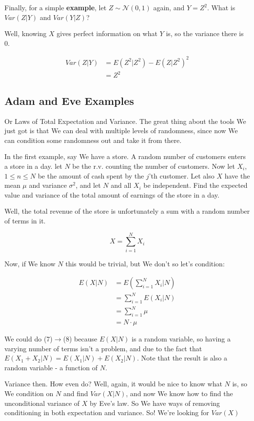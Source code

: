 \documentclass{article}
\begin{document}
		Finally, for a simple \textbf{example}, let $Z\sim\mathcal{N}(0, 1)$ again, and $Y=Z^2$. What is $Var(Z|Y)$ and $Var(Y|Z)$?
		
		Well, knowing $X$ gives perfect information on what $Y$ is, so the variance there is 0. 
		
		\begin{align*}
		Var(Z|Y) &= E(Z^2|Z^2) - E(Z|Z^2)^2\\
		&= Z^2
		\end{align*}
			
	\subsection{Adam and Eve Examples}
	
		Or Laws of Total Expectation and Variance. The great thing about the tools We just got is that We can deal with multiple levels of randomness, since now We can condition some randomness out and take it from there.
		
		In the first example, say We have a store. A random number of customers enters a store in a day. let $N$ be the r.v. counting the number of customers. Now let $X_i$, $1\le n \le N$ be the amount of cash spent by the $j$'th customer. Let also $X$ have the mean $\mu$ and variance $\sigma^2$, and let $N$ and all $X_i$ be independent. Find the expected value and variance of the total amount of earnings of the store in a day.
		
		Well, the total revenue of the store is unfortunately a sum with a random number of terms in it. 
		
		\[ X = \sum^N_{i=1} X_i\]
			
		Now, if We know $N$ this would be trivial, but We don't so let's condition:
		
		\begin{align}
		E(X|N) &= E\left( \sum^N_{i=1} X_i \bigg| N \right) \\
		&= \sum^N_{i=1} E\left( X_i | N \right) \\
		&= \sum^N_{i=1} \mu \\
		&= N\cdot \mu
		\end{align}
			
		We could do (7)$\to$(8) because $E(X|N)$ is a random variable, so having a varying number of terms isn't a problem, and due to the fact that $E(X_1+X_2|N) = E(X_1|N) + E(X_2|N)$. Note that the result is also a random variable - a function of $N$.
		
		Variance then. How even do? Well, again, it would be nice to know what $N$ is, so We condition on $N$ and find $Var(X|N)$, and now We know how to find the unconditional variance of $X$ by Eve's law. So We have ways of removing conditioning in both expectation and variance. So! We're looking for $Var(X)$
		
\end{document}
